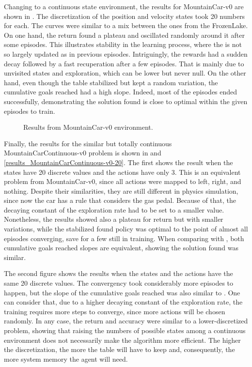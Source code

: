 \documentclass[conference]{IEEEtran}
\begin{document}
Changing to a continuous state environment, the results for MountainCar-v0 are shown in .
The discretization of the position and velocity states took 20 numbers for each.
The curves were similar to a mix between the ones from the FrozenLake.
On one hand, the return found a plateau and oscillated randomly around it after some episodes.
This illustrates stability in the learning process, where the {\Qtable} is not so largely updated as in previous episodes.
Intriguingly, the rewards had a sudden decay followed by a fast recuperation after a few episodes.
That is mainly due to unvisited states and exploration, which can be lower but never null.
On the other hand, even though the table stabilized but kept a random variation, the cumulative goals reached had a high slope.
Indeed, most of the episodes ended successfully, demonstrating the solution found is close to optimal within the given episodes to train.

\begin{figure}[!t]
    \centering
    
    \caption{Results from MountainCar-v0 environment.}
    \label{results_MountainCar-v0}
\end{figure}

Finally, the results for the similar but totally continuous MountainCarContinuous-v0 problem is shown in  and \ref{results_MountainCarContinuous-v0-20}.
The first shows the result when the states have 20 discrete values and the actions have only 3.
This is an equivalent problem from MountainCar-v0, since all actions were mapped to left, right, and nothing.
Despite their similarities, they are still different in physics simulation, since now the car has a rule that considers the gas pedal.
Because of that, the decaying constant of the exploration rate had to be set to a smaller value.
Nonetheless, the results showed also a plateau for return but with smaller variations, while the stabilized found policy was optimal to the point of almost all episodes converging, save for a few still in training.
When comparing with , both cumulative goals reached slopes are equivalent, showing the solution found was similar.

The second figure shows the results when the states and the actions have the same 20 discrete values.
The convergency took considerably more episodes to happen, but the slope of the cumulative goals reached was also similar to .
One can consider that, due to a higher decaying constant of the exploration rate, the training requires more steps to converge, since more actions will be chosen randomly.
In any case, the return and accuracy were similar to a lower-discretized problem, showing that raising the numbers of possible states among a continuous environment does not necessarily make the algorithm more efficient.
The higher the discretization, the more {\Qvalues} the table will have to keep and, consequently, the more system memory the agent will need.
\end{document}
